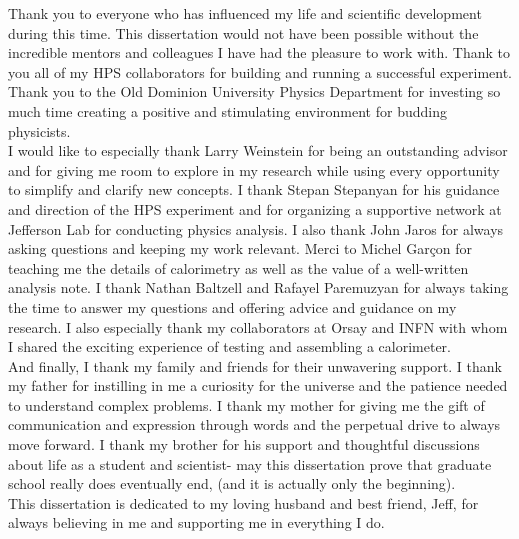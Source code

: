 Thank you to everyone who has influenced my life and scientific development during this time. This dissertation would not have been possible without the incredible mentors and colleagues I have had the pleasure to work with. Thank to you all of my HPS collaborators for building and running a successful experiment. Thank you to the Old Dominion University Physics Department for investing so much time creating a positive and stimulating environment for budding physicists.\\
\indent I would like to especially thank Larry Weinstein for being an outstanding advisor and for giving me room to explore in my research while using every opportunity to simplify and clarify new concepts. I thank Stepan Stepanyan for his guidance and direction of the HPS experiment and for organizing a supportive network at Jefferson Lab for conducting physics analysis. I also thank John Jaros for always asking questions and keeping my work relevant. Merci to Michel Gar\c con for teaching me the details of calorimetry as well as the value of a well-written analysis note. 
I thank Nathan Baltzell and Rafayel Paremuzyan for always taking the time to answer my questions and offering advice and guidance on my research. I also especially thank my collaborators at Orsay and INFN with whom I shared the exciting experience of testing and assembling a calorimeter.\\ 
\indent And finally, I thank my family and friends for their unwavering support. I thank my father for instilling in me a curiosity for the universe and the patience needed to understand complex problems. I thank my mother for giving me the gift of communication and expression through words and the perpetual drive to always move forward. I thank my brother for his support and thoughtful discussions about life as a student and scientist- may this dissertation prove that graduate school really does eventually end, (and it is actually only the beginning).\\   
\indent This dissertation is dedicated to my loving husband and best friend, Jeff, for always believing in me and supporting me in everything I do.